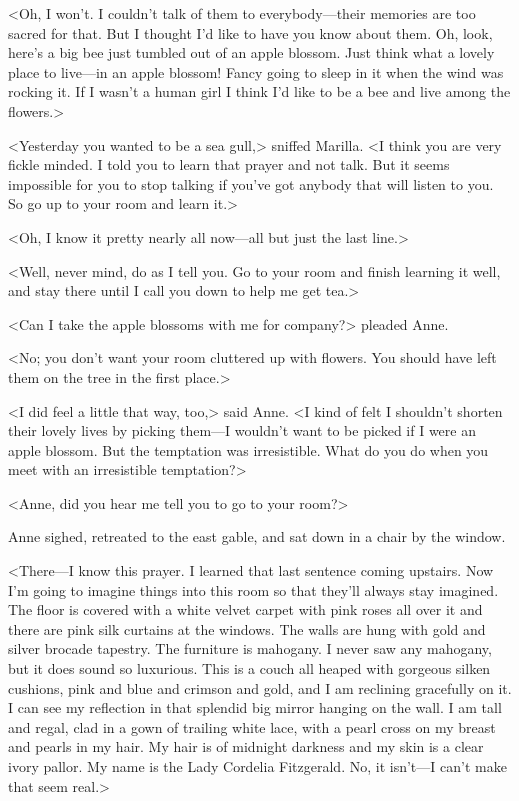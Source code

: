 <Oh, I won't. I couldn't talk of them to everybody—their memories are too sacred for that. But I thought I'd like to have you know about them. Oh, look, here's a big bee just tumbled out of an apple blossom. Just think what a lovely place to live—in an apple blossom! Fancy going to sleep in it when the wind was rocking it. If I wasn't a human girl I think I'd like to be a bee and live among the flowers.>

<Yesterday you wanted to be a sea gull,> sniffed Marilla. <I think you are very fickle minded. I told you to learn that prayer and not talk. But it seems impossible for you to stop talking if you've got anybody that will listen to you. So go up to your room and learn it.>

<Oh, I know it pretty nearly all now—all but just the last line.>

<Well, never mind, do as I tell you. Go to your room and finish learning it well, and stay there until I call you down to help me get tea.>

<Can I take the apple blossoms with me for company?> pleaded Anne.

<No; you don't want your room cluttered up with flowers. You should have left them on the tree in the first place.>

<I did feel a little that way, too,> said Anne. <I kind of felt I shouldn't shorten their lovely lives by picking them—I wouldn't want to be picked if I were an apple blossom. But the temptation was irresistible. What do you do when you meet with an irresistible temptation?>

<Anne, did you hear me tell you to go to your room?>

Anne sighed, retreated to the east gable, and sat down in a chair by the window.

<There—I know this prayer. I learned that last sentence coming upstairs. Now I'm going to imagine things into this room so that they'll always stay imagined. The floor is covered with a white velvet carpet with pink roses all over it and there are pink silk curtains at the windows. The walls are hung with gold and silver brocade tapestry. The furniture is mahogany. I never saw any mahogany, but it does sound so luxurious. This is a couch all heaped with gorgeous silken cushions, pink and blue and crimson and gold, and I am reclining gracefully on it. I can see my reflection in that splendid big mirror hanging on the wall. I am tall and regal, clad in a gown of trailing white lace, with a pearl cross on my breast and pearls in my hair. My hair is of midnight darkness and my skin is a clear ivory pallor. My name is the Lady Cordelia Fitzgerald. No, it isn't—I can't make that seem real.>

